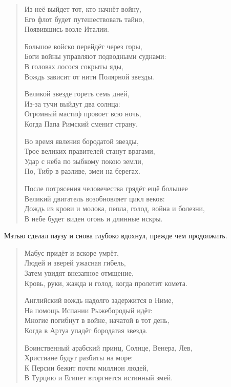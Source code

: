 \documentclass[a4paper,12pt]{book}
\begin{document}
\begin{quote}
Из неё выйдет тот, кто начнёт войну,\\
Его флот будет путешествовать тайно,\\
Появившись возле Италии.\\
\par
Большое войско перейдёт через горы,\\
Боги войны управляют подводными суднами:\\
В головах лосося сокрыты яды,\\
Вождь зависит от нити Полярной звезды.\\
\par
Великой звезде гореть семь дней,\\
Из-за тучи выйдут два солнца:\\
Огромный мастиф провоет всю ночь,\\
Когда Папа Римский сменит страну.\\
\par
Во время явления бородатой звезды,\\
Трое великих правителей станут врагами,\\
Удар с неба по зыбкому покою земли,\\
По, Тибр в разливе, змеи на берегах.\\
\par
После потрясения человечества грядёт ещё большее\\
Великий двигатель возобновляет цикл веков:\\
Дождь из крови и молока, пепла, голод, война и болезни,\\
В небе будет виден огонь и длинные искры.\\
\end{quote}
\par
Мэтью сделал паузу и снова глубоко вдохнул, прежде чем продолжить.\\
\begin{quote}
Мабус придёт и вскоре умрёт,\\
Людей и зверей ужасная гибель,\\
Затем увидят внезапное отмщение,\\
Кровь, руки, жажда и голод, когда пролетит комета.\\
\par
Английский вождь надолго задержится в Ниме,\\
На помощь Испании Рыжебородый идёт:\\
Многие погибнут в войне, начатой в тот день,\\
Когда в Артуа упадёт бородатая звезда.\\
\par
Воинственный арабский принц, Солнце, Венера, Лев,\\
Христиане будут разбиты на море:\\
К Персии бежит почти миллион людей,\\
В Турцию и Египет вторгнется истинный змей.
\end{quote}
\end{document}
